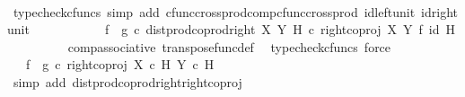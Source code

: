 \begin{isabellebody}
\ \ \ \ \ \ \ \ \isamarkupfalse%
\ {\isacharparenleft}{\kern0pt}typecheck{\isacharunderscore}{\kern0pt}cfuncs{\isacharcomma}{\kern0pt}\ simp\ add{\isacharcolon}{\kern0pt}\ cfunc{\isacharunderscore}{\kern0pt}cross{\isacharunderscore}{\kern0pt}prod{\isacharunderscore}{\kern0pt}comp{\isacharunderscore}{\kern0pt}cfunc{\isacharunderscore}{\kern0pt}cross{\isacharunderscore}{\kern0pt}prod\ id{\isacharunderscore}{\kern0pt}left{\isacharunderscore}{\kern0pt}unit{}\ id{\isacharunderscore}{\kern0pt}right{\isacharunderscore}{\kern0pt}unit{}{\isacharparenright}{\kern0pt}\isanewline
\ \ \ \ \ \ \isamarkupfalse%
\ \isamarkupfalse%
\ {\isachardoublequoteopen}{\isachardot}{\kern0pt}{\isachardot}{\kern0pt}{\isachardot}{\kern0pt}\ {\isacharequal}{\kern0pt}\ {\isacharparenleft}{\kern0pt}f\isactrlsup {\isasymflat}\ {\isasymamalg}\ g\isactrlsup {\isasymflat}\ {\isasymcirc}\isactrlsub c\ {\isacharparenleft}{\kern0pt}dist{\isacharunderscore}{\kern0pt}prod{\isacharunderscore}{\kern0pt}coprod{\isacharunderscore}{\kern0pt}right\ X\ Y\ H\ {\isasymcirc}\isactrlsub c\ right{\isacharunderscore}{\kern0pt}coproj\ X\ Y\ {\isasymtimes}\isactrlsub f\ id\ H{\isacharparenright}{\kern0pt}{\isacharparenright}{\kern0pt}\isactrlsup {\isasymsharp}{\isachardoublequoteclose}\isanewline
\ \ \ \ \ \ \ \ \isamarkupfalse%
\ comp{\isacharunderscore}{\kern0pt}associative{}\ transpose{\isacharunderscore}{\kern0pt}func{\isacharunderscore}{\kern0pt}def\ \isamarkupfalse%
\ {\isacharparenleft}{\kern0pt}typecheck{\isacharunderscore}{\kern0pt}cfuncs{\isacharcomma}{\kern0pt}\ force{\isacharparenright}{\kern0pt}\isanewline
\ \ \ \ \ \ \isamarkupfalse%
\ \isamarkupfalse%
\ {\isachardoublequoteopen}{\isachardot}{\kern0pt}{\isachardot}{\kern0pt}{\isachardot}{\kern0pt}\ {\isacharequal}{\kern0pt}\ {\isacharparenleft}{\kern0pt}f\isactrlsup {\isasymflat}\ {\isasymamalg}\ g\isactrlsup {\isasymflat}\ {\isasymcirc}\isactrlsub c\ right{\isacharunderscore}{\kern0pt}coproj\ {\isacharparenleft}{\kern0pt}X\ {\isasymtimes}\isactrlsub c\ H{\isacharparenright}{\kern0pt}\ {\isacharparenleft}{\kern0pt}Y\ {\isasymtimes}\isactrlsub c\ H{\isacharparenright}{\kern0pt}{\isacharparenright}{\kern0pt}\isactrlsup {\isasymsharp}{\isachardoublequoteclose}\isanewline
\ \ \ \ \ \ \ \ \isamarkupfalse%
\ {\isacharparenleft}{\kern0pt}simp\ add{\isacharcolon}{\kern0pt}\ dist{\isacharunderscore}{\kern0pt}prod{\isacharunderscore}{\kern0pt}coprod{\isacharunderscore}{\kern0pt}right{\isacharunderscore}{\kern0pt}right{\isacharunderscore}{\kern0pt}coproj{\isacharparenright}{\kern0pt}\isanewline

\end{isabellebody}
